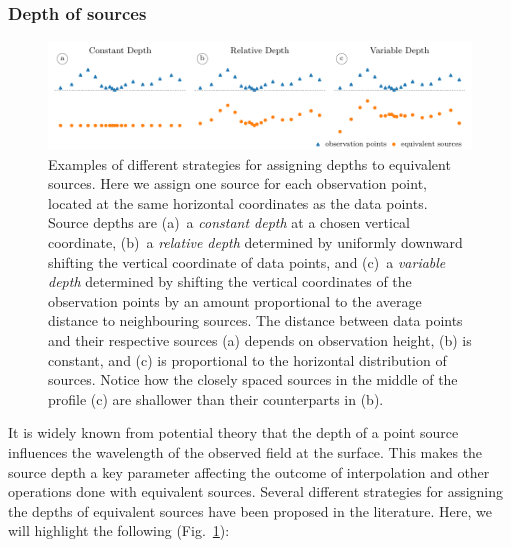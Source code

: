 \subsubsection{Depth of sources}

\begin{figure}
    \includegraphics[width=\linewidth]{figs/depth_types.pdf}
    \caption{
        Examples of different strategies for assigning depths to equivalent
        sources.
        Here we assign one source for each
        observation point, located at the same horizontal coordinates as the
        data points.
        Source depths are
        (a)~a \emph{constant depth} at a chosen vertical coordinate,
        (b)~a \emph{relative depth} determined by uniformly downward shifting
        the vertical coordinate of data points,
        and
        (c)~a \emph{variable depth} determined by shifting the vertical
        coordinates of the observation points by an amount proportional to the
        average distance to neighbouring sources.
        The distance between data points and their respective sources (a)
        depends on observation height, (b) is constant, and (c) is proportional
        to the horizontal distribution of sources.
        Notice how the closely spaced sources in the middle of the profile (c)
        are shallower than their counterparts in (b).
    }
    \label{fig:depth_types}
\end{figure}

It is widely known from potential theory that the depth of a point source
influences the wavelength of the observed field at the surface.
This makes the source depth a key parameter affecting the outcome of
interpolation and other operations done with equivalent sources.
Several different strategies for assigning the depths of equivalent sources
have been proposed in the literature.
Here, we will highlight the following (Fig.~\ref{fig:depth_types}):


